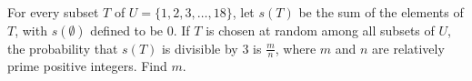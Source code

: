 For every subset $T$ of $U = \{ 1,2,3,\ldots,18 \}$,  let $s(T)$ be the sum of the elements of $T$,  with $s(\emptyset)$ defined to be $0$. If $T$ is chosen at random among all subsets of $U$,  the probability that $s(T)$ is divisible by $3$ is $\frac{m}{n}$,  where $m$ and $n$ are relatively prime positive integers. Find $m$.